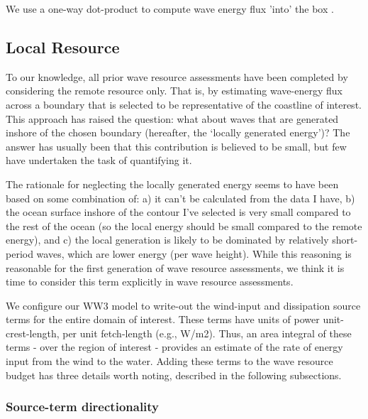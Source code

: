 \documentclass[authoryear,preprint]{elsarticle}
\begin{document}
We use a one-way dot-product to compute wave energy flux 'into' the box \citep[]{gunnQuantifyingGlobalWave2012}. 

\subsection{Local Resource}

To our knowledge, all prior wave resource assessments have been completed by considering the remote resource only. That is, by estimating wave-energy flux across a boundary that is selected to be representative of the coastline of interest. This approach has raised the question: what about waves that are generated inshore of the chosen boundary (hereafter, the ‘locally generated energy’)? The answer has usually been that this contribution is believed to be small, but few have undertaken the task of quantifying it.

The rationale for neglecting the locally generated energy seems to have been based on some combination of: a) it can’t be calculated from the data I have, b) the ocean surface inshore of the contour I’ve selected is very small compared to the rest of the ocean (so the local energy should be small compared to the remote energy), and c) the local generation is likely to be dominated by relatively short-period waves, which are lower energy (per wave height). While this reasoning is reasonable for the first generation of wave resource assessments, we think it is time to consider this term explicitly in wave resource assessments.

We configure our WW3 model to write-out the wind-input and dissipation source terms for the entire domain of interest. These terms have units of power unit-crest-length, per unit fetch-length (e.g., W/m2). Thus, an area integral of these terms - over the region of interest - provides an estimate of the rate of energy input from the wind to the water. Adding these terms to the wave resource budget has three details worth noting, described in the following subsections.

\subsubsection{Source-term directionality}
\end{document}
